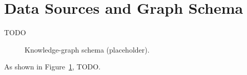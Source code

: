 \section{Data Sources and Graph Schema}\label{sec:prob_data}
TODO

\begin{figure}[H]
  \centering
  \caption{Knowledge-graph schema (placeholder).}
  \label{fig:kg_schema}
\end{figure}

As shown in Figure~\ref{fig:kg_schema}, TODO.
